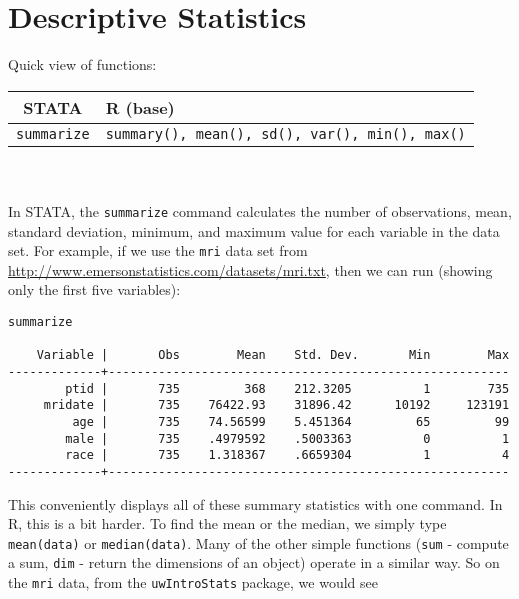 \documentclass[landscape]{article}
\begin{document}
\section{Descriptive Statistics}
Quick view of functions:\\
\begin{tabular}{c|l}
STATA & R (base) \\
\hline
\texttt{summarize} & \texttt{summary(), mean(), sd(), var(), min(), max()} 
\end{tabular}\\
\\
In STATA, the \texttt{summarize} command calculates the number of observations, mean, standard deviation, minimum, and maximum value for each variable in the data set. For example, if we use the \texttt{mri} data set from \url{http://www.emersonstatistics.com/datasets/mri.txt}, then we can run (showing only the first five variables):
\begin{verbatim}
summarize

    Variable |       Obs        Mean    Std. Dev.       Min        Max
-------------+--------------------------------------------------------
        ptid |       735         368    212.3205          1        735
     mridate |       735    76422.93    31896.42      10192     123191
         age |       735    74.56599    5.451364         65         99
        male |       735    .4979592    .5003363          0          1
        race |       735    1.318367    .6659304          1          4
-------------+--------------------------------------------------------

\end{verbatim}
This conveniently displays all of these summary statistics with one command. In R, this is a bit harder. To find the mean or the median, we simply type \texttt{mean(data)} or \texttt{median(data)}. Many of the other simple functions (\texttt{sum} - compute a sum, \texttt{dim} - return the dimensions of an object) operate in a similar way. So on the \texttt{mri} data, from the \texttt{uwIntroStats} package, we would see
\end{document}
